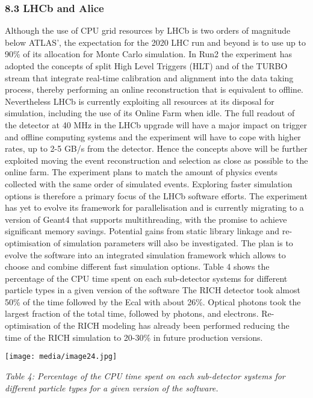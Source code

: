 \documentclass[12pt,a4paper]{article}
\begin{document}
\hypertarget{lhcb-and-alice}{%
\subsubsection{8.3 LHCb and Alice}\label{lhcb-and-alice}}

Although the use of CPU grid resources by LHCb is two orders of
magnitude below ATLAS', the expectation for the 2020 LHC run and beyond
is to use up to 90\% of its allocation for Monte Carlo simulation. In
Run2 the experiment has adopted the concepts of split High Level
Triggers (HLT) and of the TURBO stream that integrate real-time
calibration and alignment into the data taking process, thereby
performing an online reconstruction that is equivalent to offline.
Nevertheless LHCb is currently exploiting all resources at its disposal
for simulation, including the use of its Online Farm when idle. The full
readout of the detector at 40 MHz in the LHCb upgrade will have a major
impact on trigger and offline computing systems and the experiment will
have to cope with higher rates, up to 2-5 GB/s from the detector. Hence
the concepts above will be further exploited moving the event
reconstruction and selection as close as possible to the online farm.
The experiment plans to match the amount of physics events collected
with the same order of simulated events. Exploring faster simulation
options is therefore a primary focus of the LHCb software efforts. The
experiment has yet to evolve its framework for parallelisation and is
currently migrating to a version of Geant4 that supports multithreading,
with the promise to achieve significant memory savings. Potential gains
from static library linkage and re-optimisation of simulation parameters
will also be investigated. The plan is to evolve the software into an
integrated simulation framework which allows to choose and combine
different fast simulation options. Table 4 shows the percentage of the
CPU time spent on each sub-detector systems for different particle types
in a given version of the software The RICH detector took almost 50\% of
the time followed by the Ecal with about 26\%. Optical photons took the
largest fraction of the total time, followed by photons, and electrons.
Re-optimisation of the RICH modeling has already been performed reducing
the time of the RICH simulation to 20-30\% in future production
versions.

\texttt{[image: media/image24.jpg]}

\emph{Table 4: Percentage of the CPU time spent on each sub-detector
systems for different particle types for a given version of the
software.}
\end{document}
